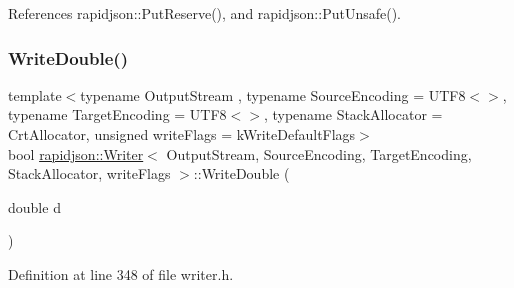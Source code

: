 References rapidjson\+::\+Put\+Reserve(), and rapidjson\+::\+Put\+Unsafe().

\mbox{\label{classrapidjson_1_1_writer_ad8cdd06dfdf1731a2148e859b828979c}} 
\subsubsection{\texorpdfstring{WriteDouble()}{WriteDouble()}\hspace{0.1cm}{\footnotesize\ttfamily [1/2]}}
{\footnotesize\ttfamily template$<$typename Output\+Stream , typename Source\+Encoding  = U\+T\+F8$<$$>$, typename Target\+Encoding  = U\+T\+F8$<$$>$, typename Stack\+Allocator  = Crt\+Allocator, unsigned write\+Flags = k\+Write\+Default\+Flags$>$ \\
bool \mbox{\hyperlink{classrapidjson_1_1_writer}{rapidjson\+::\+Writer}}$<$ Output\+Stream, Source\+Encoding, Target\+Encoding, Stack\+Allocator, write\+Flags $>$\+::Write\+Double (\begin{DoxyParamCaption}\item[{double}]{d }\end{DoxyParamCaption})\hspace{0.3cm}{\ttfamily [protected]}}



Definition at line 348 of file writer.\+h.


